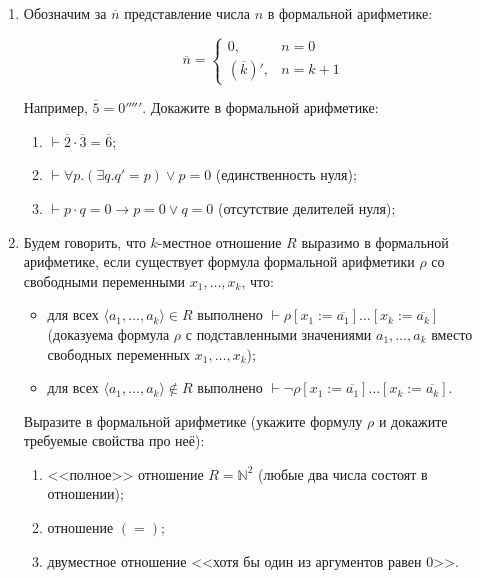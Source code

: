 \documentclass[10pt,a4paper,oneside]{article}
\begin{document}
\begin{enumerate}
\item Обозначим за $\overline{n}$ представление числа $n$ в формальной арифметике: %

$$\overline{n} = \left\{\begin{array}{ll}0, &n = 0\\
           \left(\overline{k}\right)', & n=k+1\end{array}\right.$$

Например, $\overline{5} = 0'''''$. Докажите в формальной арифметике:
\begin{enumerate}
\item $\vdash \overline{2} \cdot \overline{3} = \overline{6}$;
\item $\vdash \forall p.(\exists q.q' = p) \vee p = 0$ (единственность нуля);
\item $\vdash p \cdot q = 0 \rightarrow p = 0 \vee q = 0$ (отсутствие делителей нуля);
\end{enumerate}

\item Будем говорить, что $k$-местное отношение $R$ выразимо в формальной арифметике,
если существует формула формальной арифметики $\rho$ со свободными переменными $x_1, \dots, x_k$, что:
\begin{itemize}
\item для всех $\langle a_1, \dots, a_k \rangle \in R$ выполнено $\vdash\rho[x_1 := \overline{a_1}]\dots[x_k := \overline{a_k}]$
(доказуема формула $\rho$ с подставленными значениями $a_1, \dots, a_k$ вместо свободных переменных $x_1, \dots, x_k$);
\item для всех $\langle a_1, \dots, a_k \rangle \notin R$ выполнено $\vdash\neg\rho[x_1 := \overline{a_1}]\dots[x_k := \overline{a_k}]$.
\end{itemize}

Выразите в формальной арифметике (укажите формулу $\rho$ и докажите требуемые свойства про неё):
\begin{enumerate}
\item <<полное>> отношение $R = \mathbb{N}^2$ (любые два числа состоят в отношении);
\item отношение $(=)$;
\item двуместное отношение <<хотя бы один из аргументов равен 0>>.
\end{enumerate}

\end{enumerate}
\end{document}
